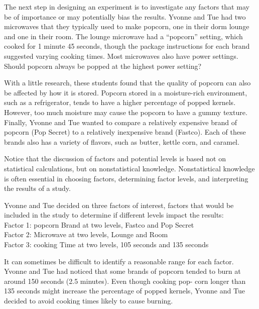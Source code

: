 \documentclass[
]{report}
\begin{document}
The next step in designing an experiment is to investigate any factors that may be of importance or may
potentially bias the results. Yvonne and Tue had two microwaves that they typically used to make popcorn,
one in their dorm lounge and one in their room. The lounge microwave had a ``popcorn'' setting, which cooked
for 1 minute 45 seconds, though the package instructions for each brand suggested varying cooking times.
Most microwaves also have power settings. Should popcorn always be popped at the highest power setting?

With a little research, these students found that the quality of popcorn can also be affected by how it is
stored. Popcorn stored in a moisture-rich environment, such as a refrigerator, tends to have a higher percentage
of popped kernels. However, too much moisture may cause the popcorn to have a gummy texture. Finally,
Yvonne and Tue wanted to compare a relatively expensive brand of popcorn (Pop Secret) to a relatively
inexpensive brand (Fastco). Each of these brands also has a variety of flavors, such as butter, kettle corn, and
caramel.

Notice that the discussion of factors and potential levels is based not on statistical calculations, but on
nonstatistical knowledge. Nonstatistical knowledge is often essential in choosing factors, determining factor
levels, and interpreting the results of a study.

Yvonne and Tue decided on three factors of interest, factors that would be included in the study to
determine if different levels impact the results:\\
Factor 1: popcorn Brand at two levels, Fastco and Pop Secret\\
Factor 2: Microwave at two levels, Lounge and Room\\
Factor 3: cooking Time at two levels, 105 seconds and 135 seconds

It can sometimes be difficult to identify a reasonable range for each factor. Yvonne and Tue had noticed
that some brands of popcorn tended to burn at around 150 seconds (2.5 minutes). Even though cooking pop-
corn longer than 135 seconds might increase the percentage of popped kernels, Yvonne and Tue decided to
avoid cooking times likely to cause burning.
\end{document}
